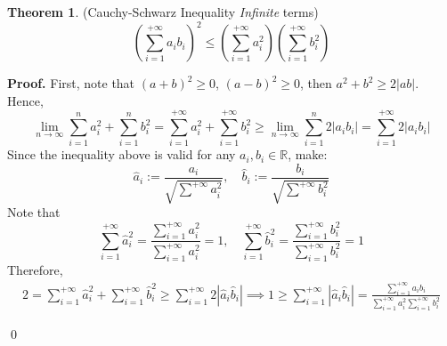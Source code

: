 \documentclass[11pt]{article}
\theoremstyle{definition}
\newenvironment{prf}[1][Proof]{\textbf{#1.} }{\qed}
\newtheorem{theorem}{Theorem}[section]
\begin{document}
\newpage
\begin{theorem}{(Cauchy-Schwarz Inequality \textit{Infinite} terms)}
   \begin{equation}
    \left( 
        \sum^{+\infty}_{i=1} a_i b_i
    \right) ^2
    \leq
    \left( 
        \sum^{+\infty}_{i=1}a_i^2
    \right)
    \left( 
    \sum^{+\infty}_{i=1}b_i^2
    \right)
   \end{equation}
\end{theorem}

\begin{shaded}
\begin{prf}
    First, note that $(a+b)^2 \geq 0$, $(a-b)^2 \geq 0$, then
    $a^2 + b^2 \geq 2 |ab|$. Hence,
    \begin{equation*}
        \lim_{n\to \infty}
        \sum^n_{i=1} a_i ^2 +
        \sum^n_{i=1} b_i ^2
         = 
        \sum^{+\infty}_{i=1} a_i ^2  
        +
        \sum^{+\infty}_{i=1} b_i ^2
        \geq
        \lim_{n\to \infty}
        \sum^n_{i=1}2|a_i b_i| =
        \sum^{+\infty}_{i=1} 2 |a_ib_i|
    \end{equation*}
    Since the inequality above is valid for any $a_i,b_i \in \mathbb R$,
    make:
    \begin{equation*}
        \hat a_i := \frac{a_i}{\sqrt{\sum^{+\infty}a_i^2}} ,\quad
        \hat b_i := \frac{b_i}{\sqrt{\sum^{+\infty}b_i^2}}
    \end{equation*}
    Note that
    \begin{equation*}
    \sum^{+\infty}_{i=1} \hat a_i ^2 = 
    \frac{\sum^{+\infty}_{i=1} a_i ^2}{\sum^{+\infty}_{i=1} a_i ^2} = 1
    , \quad
    \sum^{+\infty}_{i=1} \hat b_i ^2 = 
    \frac{\sum^{+\infty}_{i=1} b_i ^2}{\sum^{+\infty}_{i=1} b_i ^2} = 1
    \end{equation*}
    Therefore,
    \begin{align*}
        2 =
        \sum^{+\infty}_{i=1} \hat a_i ^2  
        +
        \sum^{+\infty}_{i=1} \hat b_i ^2
        \geq
        \sum^{+\infty}_{i=1} 2 |\hat a_i \hat b_i|
        \implies
        1 \geq 
        \sum^{+\infty}_{i=1} |\hat a_i \hat b_i|
        = 
        \frac{\sum^{+\infty}_{i=1} a_i b_i}
        {\sum^{+\infty}_{i=1}a_i^2
        \sum^{+\infty}_{i=1}b_i^2}
    \end{align*}

    
\end{prf}
\end{shaded}
\end{document}
